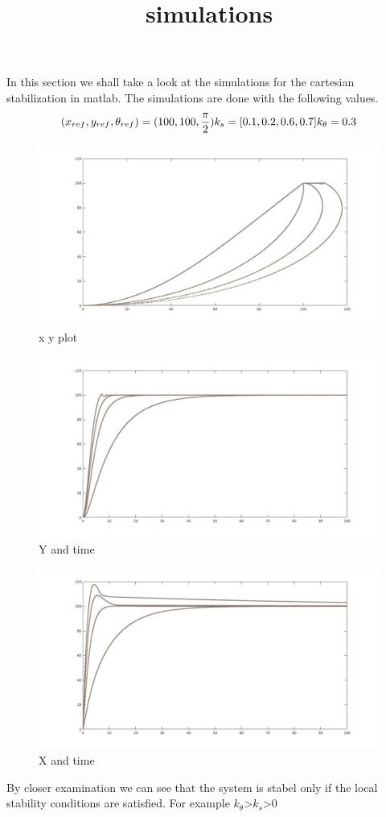 \title{simulations}

In this section we shall take a look at the simulations for the cartesian stabilization in matlab.
The simulations are done with the following values.
\begin{equation}
(x_{ref},y_{ref},\theta_{ref})=(100,100,\frac{\pi}{2})\\
k_{s}=[0.1,0.2,0.6,0.7]\\
k_{\theta}=0.3
\end{equation}

\begin{figure} 
\centering
 	\includegraphics[width=1\textwidth]{figures/xycartplot.jpg}
	
	
	\caption{x y plot} 
 	\label{fig:xyplot} 
\end{figure}

\begin{figure} 
\centering
 	\includegraphics[width=1\textwidth]{figures/yvstime.jpg}
	
	
	\caption{Y and time} 
 	\label{fig:yvstime} 
\end{figure}

\begin{figure} 
\centering
 	\includegraphics[width=1\textwidth]{figures/xvstime.jpg}
	
	
	\caption{X and time} 
 	\label{fig:xvstime} 
\end{figure}

By closer examination we can see that the system is stabel only if the local stability conditions are satisfied. For example $k_{\theta}$>$k_{s}$>0